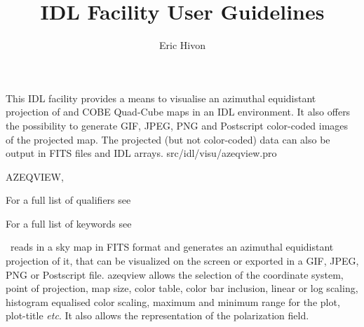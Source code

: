 




\sloppy



\title{\healpix IDL Facility User Guidelines}
 \section[azeqview]{ }
\label{idl:\thedocid}
\author{Eric Hivon}



\begin{facility}
{This IDL facility provides a means to visualise an azimuthal equidistant projection 
 of
\healpix and COBE Quad-Cube maps in an IDL environment. 
It also offers the possibility to
generate GIF, JPEG, PNG and Postscript color-coded images of the projected map.
The projected (but not color-coded) data can also be output in FITS files and
IDL arrays.}
{src/idl/visu/azeqview.pro}
\end{facility}

\begin{IDLformat}
{AZEQVIEW, 
\normalsize{
}
}
\end{IDLformat}

\begin{qualifiers}
  \begin{qulist}{} %
\item [{\  }] For a full list of qualifiers see 
  \end{qulist}
\end{qualifiers}

\begin{keywords}
  \begin{kwlist}{} %
\item [{\  }] For a full list of keywords see 
  \end{kwlist}
\end{keywords}


\begin{codedescription}
{\thedocid\ reads in a \healpix sky map in FITS format and generates an
azimuthal equidistant projection of it, that can be visualized on the screen or
exported in a GIF, JPEG, PNG or Postscript file. azeqview allows the selection of
the coordinate system, point of projection, map size, color table, color bar inclusion,
linear or log scaling, histogram equalised
color scaling, maximum and 
minimum range for the plot, plot-title {\it etc}. It also allows the representation of the
polarization field. }
\end{codedescription}

